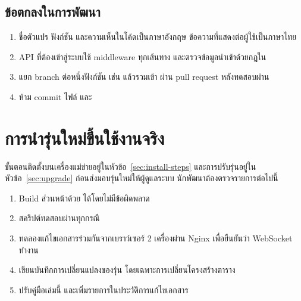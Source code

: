\subsection{ข้อตกลงในการพัฒนา}

\begin{enumerate}
  \item ชื่อตัวแปร ฟังก์ชัน และความเห็นในโค้ดเป็นภาษาอังกฤษ ข้อความที่แสดงต่อผู้ใช้เป็นภาษาไทย
  \item API ที่ต้องเข้าสู่ระบบใช้ middleware  ทุกเส้นทาง และตรวจข้อมูลนำเข้าด้วยกฎใน
  \item แยก branch ต่อหนึ่งฟังก์ชัน เช่น  แล้วรวมเข้า 
        ผ่าน pull request หลังทดสอบผ่าน
  \item ห้าม commit ไฟล์  และ 
\end{enumerate}

\section{การนำรุ่นใหม่ขึ้นใช้งานจริง}
\label{sec:deploy}

ขั้นตอนติดตั้งบนเครื่องแม่ข่ายอยู่ในหัวข้อ~\ref{sec:install-steps} และการปรับรุ่นอยู่ในหัวข้อ~\ref{sec:upgrade}
ก่อนส่งมอบรุ่นใหม่ให้ผู้ดูแลระบบ นักพัฒนาต้องตรวจรายการต่อไปนี้

\begin{enumerate}
  \item Build ส่วนหน้าด้วย  ได้โดยไม่มีข้อผิดพลาด
  \item สคริปต์ทดสอบผ่านทุกกรณี
  \item ทดลองแก้ไขเอกสารร่วมกันจากเบราว์เซอร์ 2 เครื่องผ่าน Nginx เพื่อยืนยันว่า WebSocket ทำงาน
  \item เขียนบันทึกการเปลี่ยนแปลงของรุ่น โดยเฉพาะการเปลี่ยนโครงสร้างตาราง
  \item ปรับคู่มือเล่มนี้ และเพิ่มรายการในประวัติการแก้ไขเอกสาร
\end{enumerate}
